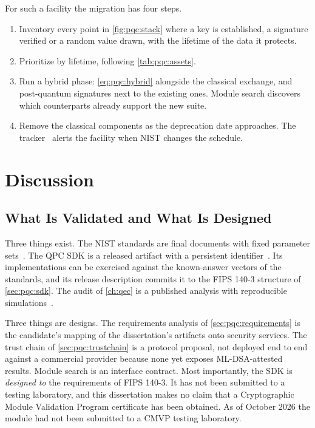 For such a facility the migration has four steps.
\begin{enumerate}
\item Inventory every point in \cref{fig:pqc:stack} where a key is established, a signature verified or a random value drawn, with the lifetime of the data it protects.
\item Prioritize by lifetime, following \cref{tab:pqc:assets}.
\item Run a hybrid phase: \cref{eq:pqc:hybrid} alongside the classical exchange, and post-quantum signatures next to the existing ones. Module search discovers which counterparts already support the new suite.
\item Remove the classical components as the deprecation date approaches. The tracker~\cite{guo2026nisttracker} alerts the facility when NIST changes the schedule.
\end{enumerate}

\section{Discussion}\label{sec:pqc:discussion}

\subsection{What Is Validated and What Is Designed}\label{sec:pqc:validated}

Three things exist. The NIST standards are final documents with fixed parameter sets~\cite{nist2024fips203,nist2024fips204,nist2024fips205}. The QPC SDK is a released artifact with a persistent identifier~\cite{guo2026lightriderqpc}. Its implementations can be exercised against the known-answer vectors of the standards, and its release description commits it to the FIPS 140-3 structure of \cref{sec:pqc:sdk}. The audit of \cref{ch:qec} is a published analysis with reproducible simulations~\cite{guo2026qecaudit}.

Three things are designs. The requirements analysis of \cref{sec:pqc:requirements} is the candidate's mapping of the dissertation's artifacts onto security services. The trust chain of \cref{sec:pqc:trustchain} is a protocol proposal, not deployed end to end against a commercial provider because none yet exposes ML-DSA-attested results. Module search is an interface contract. Most importantly, the SDK is \emph{designed to} the requirements of FIPS 140-3. It has not been submitted to a testing laboratory, and this dissertation makes no claim that a Cryptographic Module Validation Program certificate has been obtained. As of October 2026 the module had not been submitted to a CMVP testing laboratory.

